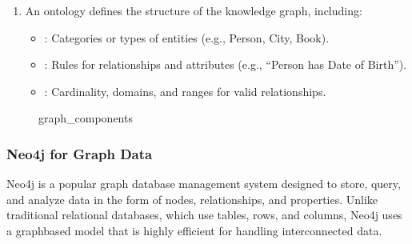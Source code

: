 \documentclass[letterpaper,11pt,english]{sphinxmanual}
\begin{document}
\begin{enumerate}
\begin{itemize}
\end{itemize}

\item {} 
\sphinxAtStartPar
{}
An ontology defines the structure of the knowledge graph, including:
\begin{itemize}
\item {} 
\sphinxAtStartPar
{}: Categories or types of entities (e.g., Person, City, Book).

\item {} 
\sphinxAtStartPar
{}: Rules for relationships and attributes (e.g., “Person has Date of Birth”).

\item {} 
\sphinxAtStartPar
{}: Cardinality, domains, and ranges for valid relationships.

\end{itemize}

\end{enumerate}

\begin{figure}[htbp]
\centering
\capstart

\noindent{}
\caption{graph\_components}\label{\detokenize{rag:id67}}\label{\detokenize{rag:fig-graph-components}}\end{figure}


\subsubsection{Neo4j for Graph Data}
\label{\detokenize{rag:neo4j-for-graph-data}}
\sphinxAtStartPar
Neo4j is a popular graph database management system designed to store, query, and analyze data
in the form of nodes, relationships, and properties. Unlike traditional relational databases,
which use tables, rows, and columns, Neo4j uses a graph\sphinxhyphen{}based model that is highly efficient
for handling interconnected data.
\end{document}
